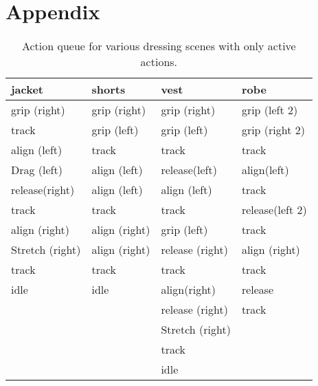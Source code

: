 \section{Appendix}

\begin{table}
	
  \begin{tabular}{|l|l|l|l|}
    \hline
    jacket 				& shorts 		& vest 			& robe \\
    \hline
    grip (right) 		& grip (right)	& grip (right)	& grip (left 2) \\
    track 				& grip (left)	& grip (left) 	& grip (right 2) \\
    align (left) 		& track 		& track 		& track\\
    Drag (left)			& align (left)	& release(left)	& align(left)\\
    release(right) 		& align (left)	& align (left)	& track\\
    track 				& track			& track			& release(left 2)\\
    align (right) 		& align (right) & grip (left)	& track\\
    Stretch	(right)		& align (right)	& release (right)& align (right)\\
    track 				& track 		& track			& track\\
    idle				& idle			& align(right)	& release\\
    					&				& release (right)& track \\
    					&				& Stretch (right)& \\
    					&				& track 		&  \\
    					&				& idle			& \\
    \hline
  \end{tabular}
  \caption{Action queue for various dressing scenes with only active actions.}
  \label{table:data}
\end{table}
